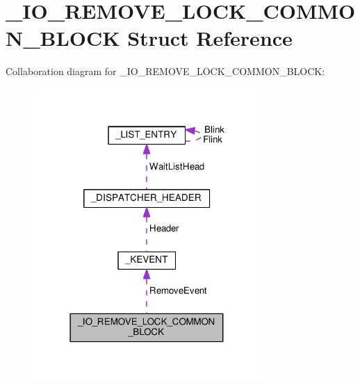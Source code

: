 \hypertarget{struct__IO__REMOVE__LOCK__COMMON__BLOCK}{}\section{\+\_\+\+I\+O\+\_\+\+R\+E\+M\+O\+V\+E\+\_\+\+L\+O\+C\+K\+\_\+\+C\+O\+M\+M\+O\+N\+\_\+\+B\+L\+O\+C\+K Struct Reference}
\label{struct__IO__REMOVE__LOCK__COMMON__BLOCK}


Collaboration diagram for \+\_\+\+I\+O\+\_\+\+R\+E\+M\+O\+V\+E\+\_\+\+L\+O\+C\+K\+\_\+\+C\+O\+M\+M\+O\+N\+\_\+\+B\+L\+O\+C\+K\+:
\nopagebreak
\begin{figure}[H]
\begin{center}
\leavevmode
\includegraphics[width=247pt]{struct__IO__REMOVE__LOCK__COMMON__BLOCK__coll__graph}
\end{center}
\end{figure}
